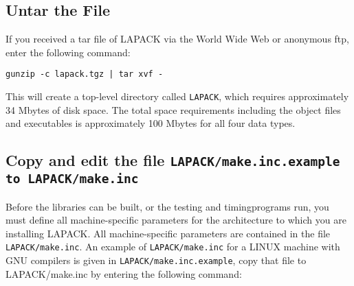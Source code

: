 \documentclass[11pt]{report}
\begin{document}
\begin{enumerate}
%
%
\end{enumerate}
 
\subsection{Untar the File}

If you received a tar file of LAPACK via the World Wide
Web or anonymous ftp, enter the following command:

\begin{list}{}
\item{\texttt{gunzip -c lapack.tgz | tar xvf -}}
\end{list}

\noindent
This will create a top-level directory called \texttt{LAPACK}, which
requires approximately 34 Mbytes of disk space.
The total space requirements including the object files and executables
is approximately 100 Mbytes for all four data types.

\subsection{Copy and edit the file \texttt{LAPACK/make.inc.example to LAPACK/make.inc}}

Before the libraries can be built, or the testing and timing\footnotemark[\value{footnote}] programs
run, you must define all machine-specific parameters for the
architecture to which you are installing LAPACK.  All machine-specific
parameters are contained in the file \texttt{LAPACK/make.inc}.
An example of  \texttt{LAPACK/make.inc} for a LINUX machine with GNU compilers is given 
in \texttt{LAPACK/make.inc.example}, copy that file to LAPACK/make.inc by entering the following command:
\end{document}
